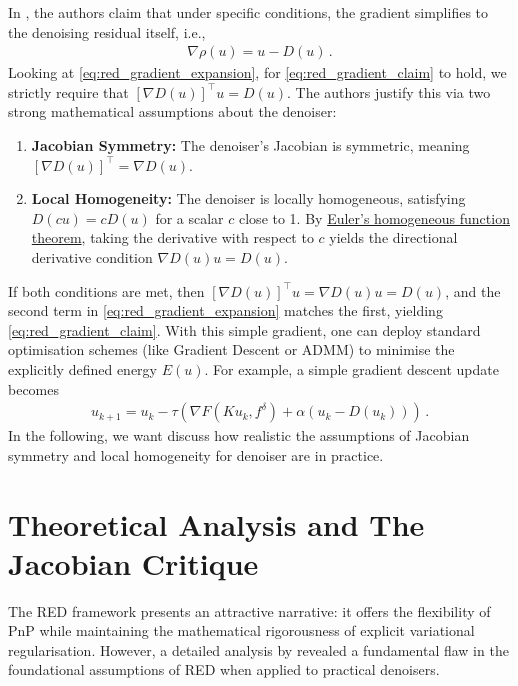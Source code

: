 In \cite{romano2017little}, the authors claim that under specific conditions, the gradient simplifies to the denoising residual itself, i.e.,
\begin{align}
    \nabla \rho(u) = u - D(u) \, .
    \label{eq:red_gradient_claim}
\end{align}
Looking at \eqref{eq:red_gradient_expansion}, for \eqref{eq:red_gradient_claim} to hold, we strictly require that $[\nabla D(u)]^\top u = D(u)$. The authors justify this via two strong mathematical assumptions about the denoiser:
\begin{enumerate}
    \item \textbf{Jacobian Symmetry:} The denoiser's Jacobian is symmetric, meaning $[\nabla D(u)]^\top = \nabla D(u)$.
    \item \textbf{Local Homogeneity:} The denoiser is locally homogeneous, satisfying $D(cu) = c D(u)$ for a scalar $c$ close to 1. By \href{https://en.wikipedia.org/wiki/Homogeneous_function#Euler's_theorem}{Euler's homogeneous function theorem}, taking the derivative with respect to $c$ yields the directional derivative condition $\nabla D(u) u = D(u)$.
\end{enumerate}
If both conditions are met, then $[\nabla D(u)]^\top u = \nabla D(u) u = D(u)$, and the second term in \eqref{eq:red_gradient_expansion} matches the first, yielding \eqref{eq:red_gradient_claim}. With this simple gradient, one can deploy standard optimisation schemes (like Gradient Descent or ADMM) to minimise the explicitly defined energy $E(u)$. For example, a simple gradient descent update becomes
\begin{align}
    u_{k+1} = u_k - \tau \left( \nabla F(Ku_k, f^\delta) + \alpha (u_k - D(u_k)) \right) \, .\label{eq:red-gd}
\end{align}
In the following, we want discuss how realistic the assumptions of Jacobian symmetry and local homogeneity for denoiser are in practice.

\section{Theoretical Analysis and The Jacobian Critique}
\label{sec:pnp_critique}

The RED framework presents an attractive narrative: it offers the flexibility of PnP while maintaining the mathematical rigorousness of explicit variational regularisation. However, a detailed analysis by \cite{reehorst2018regularization} revealed a fundamental flaw in the foundational assumptions of RED when applied to practical denoisers.

